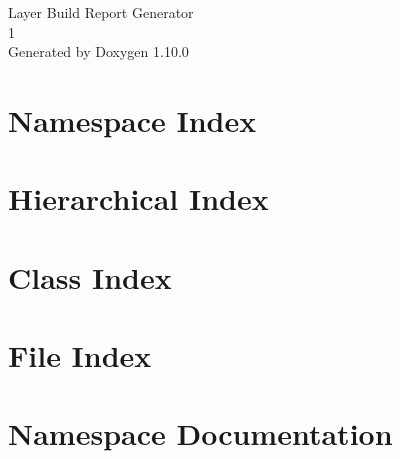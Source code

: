 \documentclass[twoside]{book}
\newcommand{\+}{\discretionary{\mbox{\scriptsize$\hookleftarrow$}}{}{}}
\newcommand{\clearemptydoublepage}{%
    \newpage{\pagestyle{empty}\cleardoublepage}%
  }
\begin{document}
  \raggedbottom
    \hypersetup{pageanchor=false,
                bookmarksnumbered=true,
                pdfencoding=unicode
               }
  \begin{titlepage}
  \vspace*{7cm}
  \begin{center}%
  {\Large Layer Build Report Generator}\\
  [1ex]\large 1 \\
  \vspace*{1cm}
  {\large Generated by Doxygen 1.10.0}\\
  \end{center}
  \end{titlepage}
  \clearemptydoublepage
  \tableofcontents
  \clearemptydoublepage
  \hypersetup{pageanchor=true}
\chapter{Namespace Index}

\chapter{Hierarchical Index}

\chapter{Class Index}

\chapter{File Index}

\chapter{Namespace Documentation}

\end{document}
